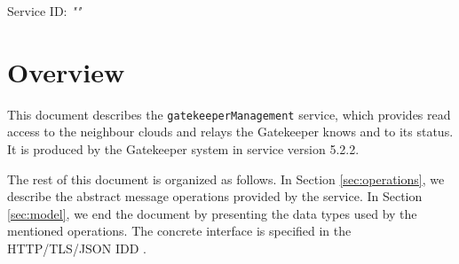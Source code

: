 \documentclass[a4paper]{arrowhead}
\begin{document}
\sloppy

\ArrowheadSetup

\begin{center}
  \vspace*{1cm}
  \huge{\arrowtitle}

  \vspace*{0.2cm}
  \LARGE{\arrowtype}
  \vspace*{1cm}

  \Large{Service ID: \textit{"\arrowid"}}

  \vspace*{\fill}


  \vspace*{1cm}
  \vspace*{\fill}

  \begin{abstract}
    This document describes the \texttt{gatekeeper\allowbreak{}Management} service, version 5.2.2, produced by the Gatekeeper support system of Arrowhead 5.2.2.
  \end{abstract}

  \vspace*{1cm}
\end{center}

\newpage

\tableofcontents
\newpage

\section{Overview}
\label{sec:overview}

This document describes the \texttt{gatekeeper\allowbreak{}Management} service, which provides read access to the neighbour clouds and relays the Gatekeeper knows and to its status.
It is produced by the Gatekeeper system \cite{gk-sysd} in service version 5.2.2.

The rest of this document is organized as follows.
In Section \ref{sec:operations}, we describe the abstract message operations provided by the service.
In Section \ref{sec:model}, we end the document by presenting the data types used by the mentioned operations.
The concrete interface is specified in the HTTP/TLS/JSON IDD \cite{gk-gatekeeperManagement-http-idd}.
\end{document}

